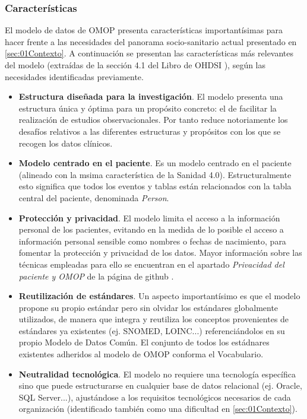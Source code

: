\subsubsection{Características}

El modelo de datos de OMOP presenta características importantísimas para hacer frente a las necesidades del panorama socio-sanitario actual presentado en \ref{sec:01Contexto}. A continuación se presentan las características más relevantes del modelo (extraídas de la sección  4.1 del Libro de OHDSI \cite{OHDSIbook}), según las necesidades identificadas previamente.

\begin{itemize}
    \item \textbf{Estructura diseñada para la investigación}. 
    El modelo presenta una estructura única y óptima para un propósito concreto: el de facilitar la realización de estudios observacionales. Por tanto reduce notoriamente los desafíos relativos a las diferentes estructuras y propósitos con los que se recogen los datos clínicos.
    \item \textbf{Modelo centrado en el paciente}. Es un modelo centrado en el paciente (alineado con la msima característica de la Sanidad 4.0). Estructuralmente esto significa que todos los eventos y tablas están relacionados con la tabla central del paciente, denominada \textit{Person}. 
    \item \textbf{Protección y privacidad}. El modelo limita el acceso a la información personal de los pacientes, evitando en la medida de lo posible el acceso a información personal sensible como nombres o fechas de nacimiento, para fomentar la protección y privacidad de los datos. Mayor información sobre las técnicas empleadas para ello se encuentran en el apartado \textit{Privacidad del paciente y OMOP} de la página de github \cite{gitPagesCMD}.
    \item \textbf{Reutilización de estándares}. Un aspecto importantísimo es que el modelo propone su propio estándar pero sin olvidar los estándares globalmente utilizados, de manera que integra y reutiliza los conceptos provenientes de estándares ya existentes (ej. SNOMED, LOINC...) referenciándolos en su propio Modelo de Datos Común. El conjunto de todos los estádnares existentes adheridos al modelo de OMOP conforma el Vocabulario.
    \item \textbf{Neutralidad tecnológica}. El modelo no requiere una tecnología específica sino que puede estructurarse en cualquier base de datos relacional (ej. Oracle, SQL Server...), ajustándose a los requisitos tecnológicos necesarios de cada organización (identificado también como una dificultad en \ref{sec:01Contexto}).
    
\end{itemize}

